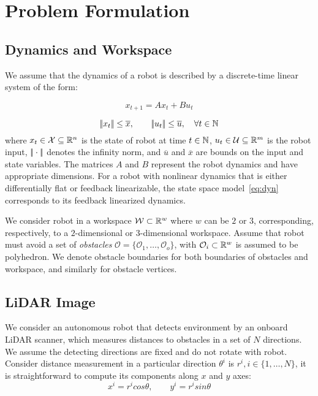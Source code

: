 \section{Problem Formulation}


\subsection{Dynamics and Workspace}

We assume that the dynamics of a robot is described by a discrete-time linear system of the form:

\begin{equation}
    \label{eq:dyn}    
    x_{t+1} = A x_{t} + B u_{t} 
\end{equation}

\begin{equation}
    \label{eq:ulimit}    
    |\!|x_t|\!| \le \overline{x}, \qquad |\!|u_t|\!| \le \overline{u}, \quad \forall t \in {\mathbb{N}}
\end{equation}
where $x_t \in \mathcal{X} \subseteq {\mathbb{R}}^{n}$ is the state of robot at time $t \in {\mathbb{N}}$, 
$u_t \in \mathcal{U} \subseteq {\mathbb{R}}^{m}$ is the robot input, $|\!|\cdot|\!|$ denotes the infinity norm,
and $\overline{u}$ and $\overline{x}$ are bounds on the input and state variables. 
The matrices $A$ and $B$ represent the robot dynamics and have appropriate dimensions. 
For a robot with nonlinear dynamics that is either differentially flat or feedback linearizable, 
the state space model~\eqref{eq:dyn} corresponds to its feedback linearized dynamics.

We consider robot in a workspace ${\mathcal{W}} \subset {\mathbb{R}}^{w}$ where $w$ can be $2$ or $3$, 
corresponding,  respectively, to a $2$-dimensional or $3$-dimensional workspace. 
Assume that robot must avoid a set of \emph{obstacles} $\mathcal{O} = \{\mathcal{O}_1, \ldots, \mathcal{O}_o\}$, 
with $\mathcal{O}_i \subset {\mathbb{R}}^w$ is assumed to be polyhedron.
We denote obstacle boundaries for both boundaries of obstacles and workspace, and similarly for obstacle vertices. 



\subsection{LiDAR Image}
We consider an autonomous robot that detects environment by an onboard LiDAR scanner, 
which measures distances to obstacles in a set of $N$ directions.
We assume the detecting directions are fixed and do not rotate with robot.
Consider distance measurement in a particular direction $\theta^i$ is $r^i, i\in\{1,\ldots,N\}$,
it is straightforward to compute its components along $x$ and $y$ axes:
\begin{equation}
    \label{eq:distance}
    x^i = r^i cos \theta, \qquad y^i = r^i sin \theta
\end{equation}

